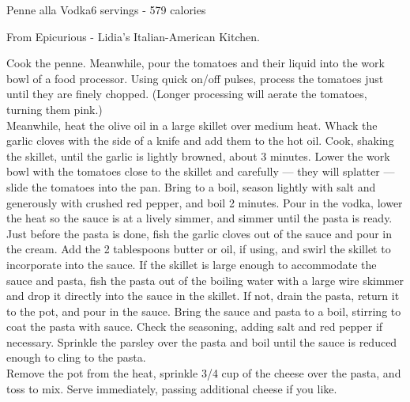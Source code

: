 \begin{recipe}{Penne alla Vodka}{6 servings - 579 calories}{}

\freeform From Epicurious - Lidia's Italian-American Kitchen.


Cook the penne. Meanwhile, pour the tomatoes and their liquid into the work bowl of a food processor. Using quick on/off pulses, process the tomatoes just until they are finely chopped. (Longer processing will aerate the tomatoes, turning them pink.)\\

Meanwhile, heat the olive oil in a large skillet over medium heat. Whack the garlic cloves with the side of a knife and add them to the hot oil. Cook, shaking the skillet, until the garlic is lightly browned, about 3 minutes. Lower the work bowl with the tomatoes close to the skillet and carefully — they will splatter — slide the tomatoes into the pan. Bring to a boil, season lightly with salt and generously with crushed red pepper, and boil 2 minutes. Pour in the vodka, lower the heat so the sauce is at a lively simmer, and simmer until the pasta is ready.\\

Just before the pasta is done, fish the garlic cloves out of the sauce and pour in the cream. Add the 2 tablespoons butter or oil, if using, and swirl the skillet to incorporate into the sauce. If the skillet is large enough to accommodate the sauce and pasta, fish the pasta out of the boiling water with a large wire skimmer and drop it directly into the sauce in the skillet. If not, drain the pasta, return it to the pot, and pour in the sauce. Bring the sauce and pasta to a boil, stirring to coat the pasta with sauce. Check the seasoning, adding salt and red pepper if necessary. Sprinkle the parsley over the pasta and boil until the sauce is reduced enough to cling to the pasta.\\

Remove the pot from the heat, sprinkle 3/4 cup of the cheese over the pasta, and toss to mix. Serve immediately, passing additional cheese if you like.\\

\end{recipe}